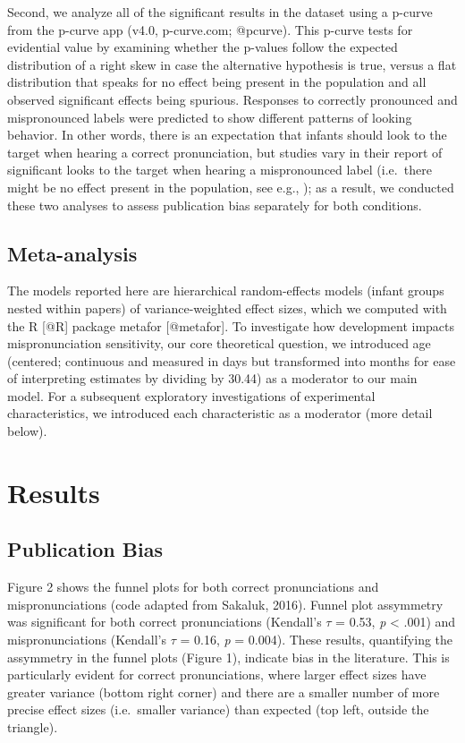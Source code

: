\documentclass[man]{apa6}
\theoremstyle{definition}
\theoremstyle{definition}
\theoremstyle{definition}
\theoremstyle{remark}
\begin{document}
Second, we analyze all of the significant results in the dataset using a
p-curve from the p-curve app (v4.0, p-curve.com; @pcurve). This p-curve
tests for evidential value by examining whether the p-values follow the
expected distribution of a right skew in case the alternative hypothesis
is true, versus a flat distribution that speaks for no effect being
present in the population and all observed significant effects being
spurious. Responses to correctly pronounced and mispronounced labels
were predicted to show different patterns of looking behavior. In other
words, there is an expectation that infants should look to the target
when hearing a correct pronunciation, but studies vary in their report
of significant looks to the target when hearing a mispronounced label
(i.e.~there might be no effect present in the population, see e.g., );
as a result, we conducted these two analyses to assess publication bias
separately for both conditions.

\subsection{Meta-analysis}\label{meta-analysis}

The models reported here are hierarchical random-effects models (infant
groups nested within papers) of variance-weighted effect sizes, which we
computed with the R {[}@R{]} package metafor {[}@metafor{]}. To
investigate how development impacts mispronunciation sensitivity, our
core theoretical question, we introduced age (centered; continuous and
measured in days but transformed into months for ease of interpreting
estimates by dividing by 30.44) as a moderator to our main model. For a
subsequent exploratory investigations of experimental characteristics,
we introduced each characteristic as a moderator (more detail below).

\section{Results}\label{results}

\subsection{Publication Bias}\label{publication-bias-1}

Figure 2 shows the funnel plots for both correct pronunciations and
mispronunciations (code adapted from Sakaluk, 2016). Funnel plot
assymmetry was significant for both correct pronunciations (Kendall's
\(\tau\) = 0.53, \emph{p} \textless{} .001) and mispronunciations
(Kendall's \(\tau\) = 0.16, \emph{p} = 0.004). These results,
quantifying the assymmetry in the funnel plots (Figure 1), indicate bias
in the literature. This is particularly evident for correct
pronunciations, where larger effect sizes have greater variance (bottom
right corner) and there are a smaller number of more precise effect
sizes (i.e.~smaller variance) than expected (top left, outside the
triangle).
\end{document}
